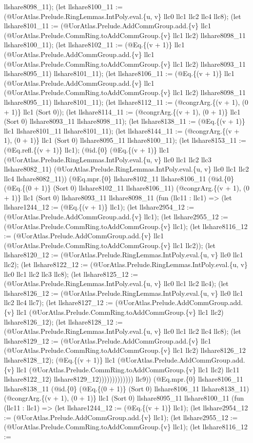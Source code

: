 \documentclass[11pt]{article}
\begin{document}
llshare8098\_11); (let llshare8100\_11 := (@UorAtlas.Prelude.RingLemmas.IntPoly.eval.\{u, v\} llc0 llc1 llc2 llc4 llc8); (let llshare8101\_11 := (@UorAtlas.Prelude.AddCommGroup.add.\{v\} llc1 (@UorAtlas.Prelude.CommRing.toAddCommGroup.\{v\} llc1 llc2) llshare8098\_11 llshare8100\_11); (let llshare8102\_11 := (@Eq.\{(v + 1)\} llc1 (@UorAtlas.Prelude.AddCommGroup.add.\{v\} llc1 (@UorAtlas.Prelude.CommRing.toAddCommGroup.\{v\} llc1 llc2) llshare8093\_11 llshare8095\_11) llshare8101\_11); (let llshare8106\_11 := (@Eq.\{(v + 1)\} llc1 (@UorAtlas.Prelude.AddCommGroup.add.\{v\} llc1 (@UorAtlas.Prelude.CommRing.toAddCommGroup.\{v\} llc1 llc2) llshare8098\_11 llshare8095\_11) llshare8101\_11); (let llshare8112\_11 := (@congrArg.\{(v + 1), (0 + 1)\} llc1 (Sort 0)); (let llshare8114\_11 := (@congrArg.\{(v + 1), (0 + 1)\} llc1 (Sort 0) llshare8093\_11 llshare8098\_11); (let llshare8138\_11 := (@Eq.\{(v + 1)\} llc1 llshare8101\_11 llshare8101\_11); (let llshare8144\_11 := (@congrArg.\{(v + 1), (0 + 1)\} llc1 (Sort 0) llshare8095\_11 llshare8100\_11); (let llshare8153\_11 := (@Eq.refl.\{(v + 1)\} llc1); (@id.\{0\} (@Eq.\{(v + 1)\} llc1 (@UorAtlas.Prelude.RingLemmas.IntPoly.eval.\{u, v\} llc0 llc1 llc2 llc3 llshare8082\_11) (@UorAtlas.Prelude.RingLemmas.IntPoly.eval.\{u, v\} llc0 llc1 llc2 llc4 llshare8082\_11)) (@Eq.mpr.\{0\} llshare8102\_11 llshare8106\_11 (@id.\{0\} (@Eq.\{(0 + 1)\} (Sort 0) llshare8102\_11 llshare8106\_11) (@congrArg.\{(v + 1), (0 + 1)\} llc1 (Sort 0) llshare8093\_11 llshare8098\_11 (fun (llc11 : llc1) => (let llshare1244\_12 := (@Eq.\{(v + 1)\} llc1); (let llshare2954\_12 := (@UorAtlas.Prelude.AddCommGroup.add.\{v\} llc1); (let llshare2955\_12 := (@UorAtlas.Prelude.CommRing.toAddCommGroup.\{v\} llc1); (let llshare8116\_12 := (@UorAtlas.Prelude.AddCommGroup.add.\{v\} llc1 (@UorAtlas.Prelude.CommRing.toAddCommGroup.\{v\} llc1 llc2)); (let llshare8120\_12 := (@UorAtlas.Prelude.RingLemmas.IntPoly.eval.\{u, v\} llc0 llc1 llc2); (let llshare8122\_12 := (@UorAtlas.Prelude.RingLemmas.IntPoly.eval.\{u, v\} llc0 llc1 llc2 llc3 llc8); (let llshare8125\_12 := (@UorAtlas.Prelude.RingLemmas.IntPoly.eval.\{u, v\} llc0 llc1 llc2 llc4); (let llshare8126\_12 := (@UorAtlas.Prelude.RingLemmas.IntPoly.eval.\{u, v\} llc0 llc1 llc2 llc4 llc7); (let llshare8127\_12 := (@UorAtlas.Prelude.AddCommGroup.add.\{v\} llc1 (@UorAtlas.Prelude.CommRing.toAddCommGroup.\{v\} llc1 llc2) llshare8126\_12); (let llshare8128\_12 := (@UorAtlas.Prelude.RingLemmas.IntPoly.eval.\{u, v\} llc0 llc1 llc2 llc4 llc8); (let llshare8129\_12 := (@UorAtlas.Prelude.AddCommGroup.add.\{v\} llc1 (@UorAtlas.Prelude.CommRing.toAddCommGroup.\{v\} llc1 llc2) llshare8126\_12 llshare8128\_12); (@Eq.\{(v + 1)\} llc1 (@UorAtlas.Prelude.AddCommGroup.add.\{v\} llc1 (@UorAtlas.Prelude.CommRing.toAddCommGroup.\{v\} llc1 llc2) llc11 llshare8122\_12) llshare8129\_12))))))))))))) llc9)) (@Eq.mpr.\{0\} llshare8106\_11 llshare8138\_11 (@id.\{0\} (@Eq.\{(0 + 1)\} (Sort 0) llshare8106\_11 llshare8138\_11) (@congrArg.\{(v + 1), (0 + 1)\} llc1 (Sort 0) llshare8095\_11 llshare8100\_11 (fun (llc11 : llc1) => (let llshare1244\_12 := (@Eq.\{(v + 1)\} llc1); (let llshare2954\_12 := (@UorAtlas.Prelude.AddCommGroup.add.\{v\} llc1); (let llshare2955\_12 := (@UorAtlas.Prelude.CommRing.toAddCommGroup.\{v\} llc1); (let llshare8116\_12 := 
\end{document}
